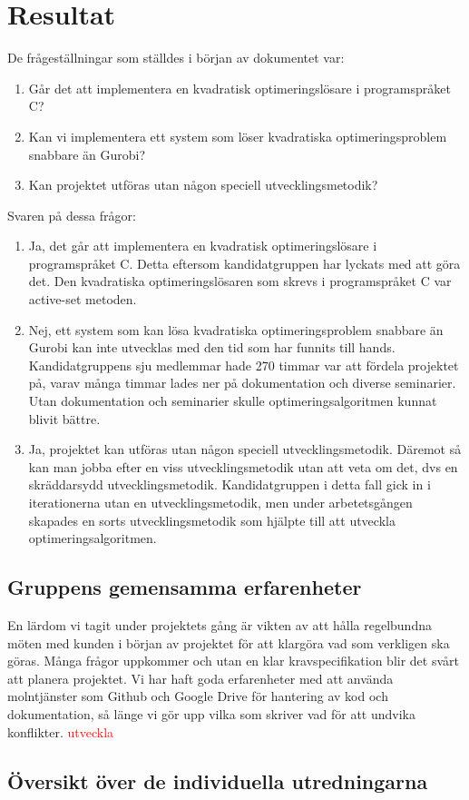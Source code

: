 \section{Resultat}

De frågeställningar som ställdes i början av dokumentet var:
\begin{enumerate}
\item Går det att implementera en kvadratisk optimeringslösare i programspråket C?
\item Kan vi implementera ett system som löser kvadratiska optimeringsproblem snabbare än Gurobi?
\item Kan projektet utföras utan någon speciell utvecklingsmetodik? 
\end{enumerate}

Svaren på dessa frågor:
\begin{enumerate}
\item Ja, det går att implementera en kvadratisk optimeringslösare i programspråket C. Detta eftersom kandidatgruppen har lyckats med att göra det. Den kvadratiska optimeringslösaren som skrevs i programspråket C var active-set metoden. 

\item Nej, ett system som kan lösa kvadratiska optimeringsproblem snabbare än Gurobi kan inte utvecklas med den tid som har funnits till hands. Kandidatgruppens sju medlemmar hade 270 timmar var att fördela projektet på, varav många timmar lades ner på dokumentation och diverse seminarier. Utan dokumentation och seminarier skulle optimeringsalgoritmen kunnat blivit bättre.

\item Ja, projektet kan utföras utan någon speciell utvecklingsmetodik. Däremot så kan man jobba efter en viss utvecklingsmetodik utan att veta om det, dvs en skräddarsydd utvecklingsmetodik. Kandidatgruppen i detta fall gick in i iterationerna utan en utvecklingsmetodik, men under arbetetsgången skapades en sorts utvecklingsmetodik som hjälpte till att utveckla optimeringsalgoritmen.
\end{enumerate}
	
	
\subsection{Gruppens gemensamma erfarenheter}
En lärdom vi tagit under projektets gång är vikten av att hålla regelbundna möten med kunden i början av projektet för att klargöra vad som verkligen ska göras. Många frågor uppkommer och utan en klar kravspecifikation blir det svårt att planera projektet.
\newline
\newline
Vi har haft goda erfarenheter med att använda molntjänster som Github och Google Drive för hantering av kod och dokumentation, så länge vi gör upp vilka som skriver vad för att undvika konflikter.  
\textcolor{red}{ utveckla}

\subsection{Översikt över de individuella utredningarna}